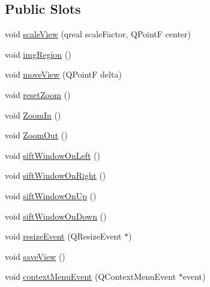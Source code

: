 \subsection*{Public Slots}
\begin{DoxyCompactItemize}
\item 
void \hyperlink{classViewPort_af68a292bada1aadd5b3cbcd5cd86620c}{scale\-View} (qreal scale\-Factor, Q\-Point\-F center)
\item 
void \hyperlink{classViewPort_a60f919b3f7329bb5de060fa3befda08b}{img\-Region} ()
\item 
void \hyperlink{classViewPort_a3e318f428a0d0cc2e5c3835f1c77cc06}{move\-View} (Q\-Point\-F delta)
\item 
void \hyperlink{classViewPort_af9e56726827ee1679b536d90586b3add}{reset\-Zoom} ()
\item 
void \hyperlink{classViewPort_a4a67d1ac61dfdf063909b9fa5299893f}{Zoom\-In} ()
\item 
void \hyperlink{classViewPort_a4f26ce0e84539f49b95aa5d43820bb85}{Zoom\-Out} ()
\item 
void \hyperlink{classViewPort_ab8d8fbc8a150d158840e73dc3d28d4e9}{sift\-Window\-On\-Left} ()
\item 
void \hyperlink{classViewPort_ad75dd8cdf0fcefa9f3afb7af78ffa1fc}{sift\-Window\-On\-Right} ()
\item 
void \hyperlink{classViewPort_a539a1c2895777e89b1431146ccb26a26}{sift\-Window\-On\-Up} ()
\item 
void \hyperlink{classViewPort_aa05e98b5c021662068856f9b8f25a299}{sift\-Window\-On\-Down} ()
\item 
void \hyperlink{classViewPort_a7a1fec5745e2bd12c11f0f4a8c17183f}{resize\-Event} (Q\-Resize\-Event $\ast$)
\item 
void \hyperlink{classViewPort_a69445bb6b5b203923b6707b583cdc0d8}{save\-View} ()
\item 
void \hyperlink{classViewPort_af3c98b34c5ff602bd74c5b95425de4a9}{context\-Menu\-Event} (Q\-Context\-Menu\-Event $\ast$event)
\end{DoxyCompactItemize}
